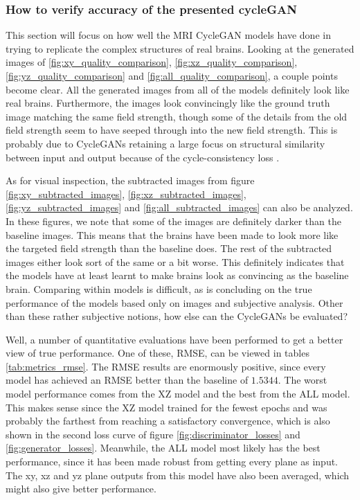\documentclass[12pt, fleqn, titlepage]{article}
\newcommand{\1}[1]{\mathds{1}\left[#1\right]}
\begin{document}
\subsubsection{How to verify accuracy of the presented cycleGAN}\label{discuss_measure}
This section will focus on how well the MRI CycleGAN models have done in trying to replicate the complex structures of real brains. Looking at the generated images of \ref{fig:xy_quality_comparison}, \ref{fig:xz_quality_comparison}, \ref{fig:yz_quality_comparison} and \ref{fig:all_quality_comparison}, a couple points become clear. All the generated images from all of the models definitely look like real brains. Furthermore, the images look convincingly like the ground truth image matching the same field strength, though some of the details from the old field strength seem to have seeped through into the new field strength. This is probably due to CycleGANs retaining a large focus on structural similarity between input and output because of the cycle-consistency loss \cite{better_cycles_losses}.

As for visual inspection, the subtracted images from figure \ref{fig:xy_subtracted_images}, \ref{fig:xz_subtracted_images}, \ref{fig:yz_subtracted_images} and \ref{fig:all_subtracted_images} can also be analyzed. In these figures, we note that some of the images are definitely darker than the baseline images. This means that the brains have been made to look more like the targeted field strength than the baseline does. The rest of the subtracted images either look sort of the same or a bit worse. This definitely indicates that the models have at least learnt to make brains look as convincing as the baseline brain. Comparing within models is difficult, as is concluding on the true performance of the models based only on images and subjective analysis. Other than these rather subjective notions, how else can the CycleGANs be evaluated?

Well, a number of quantitative evaluations have been performed to get a better view of true performance. One of these, RMSE, can be viewed in tables \ref{tab:metrics_rmse}. The RMSE results are enormously positive, since every model has achieved an RMSE better than the baseline of $1.5344$. The worst model performance comes from the XZ model and the best from the ALL model. This makes sense since the XZ model trained for the fewest epochs and was probably the farthest from reaching a satisfactory convergence, which is also shown in the second loss curve of figure \ref{fig:discriminator_losses} and \ref{fig:generator_losses}. Meanwhile, the ALL model most likely has the best performance, since it has been made robust from getting every plane as input. The xy, xz and yz plane outputs from this model have also been averaged, which might also give better performance.
\end{document}
